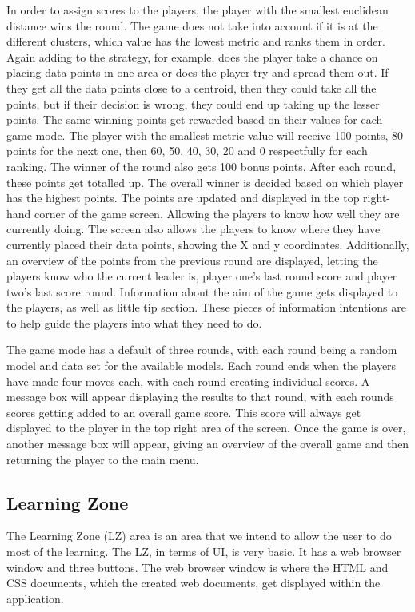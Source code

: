 		In order to assign scores to the players, the player with the smallest euclidean distance wins the round. The game does not take into account if it is at the different clusters, which value has the lowest metric and ranks them in order. Again adding to the strategy, for example, does the player take a chance on placing data points in one area or does the player try and spread them out. If they get all the data points close to a centroid, then they could take all the points, but if their decision is wrong, they could end up taking up the lesser points. The same winning points get rewarded based on their values for each game mode. The player with the smallest metric value will receive 100 points, 80 points for the next one, then 60, 50, 40, 30, 20 and 0 respectfully for each ranking. The winner of the round also gets 100 bonus points. After each round, these points get totalled up. The overall winner is decided based on which player has the highest points. The points are updated and displayed in the top right-hand corner of the game screen. Allowing the players to know how well they are currently doing. The screen also allows the players to know where they have currently placed their data points, showing the X and y coordinates.  Additionally, an overview of the points from the previous round are displayed, letting the players know who the current leader is, player one's last round score and player two's last score round. Information about the aim of the game gets displayed to the players, as well as little tip section. These pieces of information intentions are to help guide the players into what they need to do.
		
		The game mode has a default of three rounds, with each round being a random model and data set for the available models. Each round ends when the players have made four moves each, with each round creating individual scores. A message box will appear displaying the results to that round, with each rounds scores getting added to an overall game score. This score will always get displayed to the player in the top right area of the screen. Once the game is over, another message box will appear, giving an overview of the overall game and then returning the player to the main menu.
	
	
	\subsection{Learning Zone}
	
		The Learning Zone (LZ) area is an area that we intend to allow the user to do most of the learning. The LZ, in terms of UI, is very basic. It has a web browser window and three buttons. The web browser window is where the HTML and CSS documents, which the created web documents, get displayed within the application. 
	
